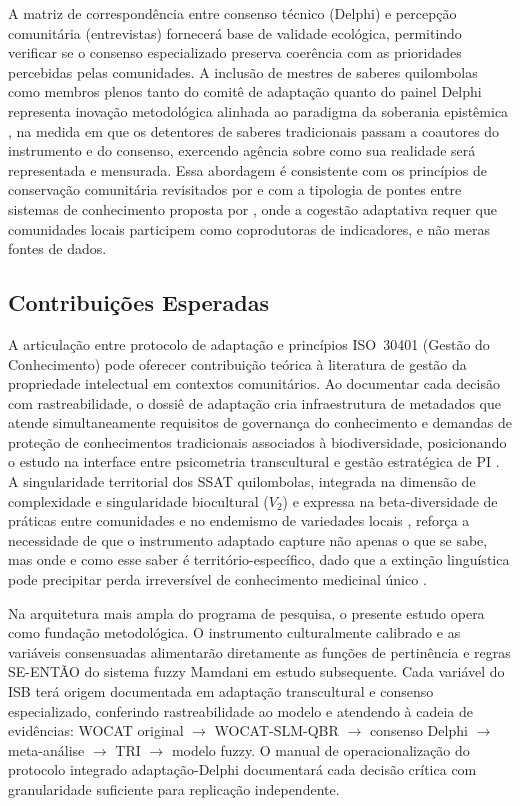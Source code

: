 \documentclass[3p,times]{elsarticle}
\begin{document}
A matriz de correspondência entre consenso técnico (Delphi) e percepção comunitária (entrevistas) fornecerá base de validade ecológica, permitindo verificar se o consenso especializado preserva coerência com as prioridades percebidas pelas comunidades. A inclusão de mestres de saberes quilombolas como membros plenos tanto do comitê de adaptação quanto do painel Delphi representa inovação metodológica alinhada ao paradigma da soberania epistêmica \citep{Santos2007}, na medida em que os detentores de saberes tradicionais passam a coautores do instrumento e do consenso, exercendo agência sobre como sua realidade será representada e mensurada. Essa abordagem é consistente com os princípios de conservação comunitária revisitados por \citet{Berkes2004,Berkes2007} e com a tipologia de pontes entre sistemas de conhecimento proposta por \citet{Rathwell2015}, onde a cogestão adaptativa \citep{OlssonFolkeBerkes2004} requer que comunidades locais participem como coprodutoras de indicadores, e não meras fontes de dados.

\subsection{Contribuições Esperadas}

A articulação entre protocolo de adaptação e princípios ISO~30401 (Gestão do Conhecimento) pode oferecer contribuição teórica à literatura de gestão da propriedade intelectual em contextos comunitários. Ao documentar cada decisão com rastreabilidade, o dossiê de adaptação cria infraestrutura de metadados que atende simultaneamente requisitos de governança do conhecimento \citep{ISO30401} e demandas de proteção de conhecimentos tradicionais associados à biodiversidade, posicionando o estudo na interface entre psicometria transcultural e gestão estratégica de PI \citep{Teece1986,ISO56005}. A singularidade territorial dos SSAT quilombolas, integrada na dimensão de complexidade e singularidade biocultural ($V_2$) e expressa na beta-diversidade de práticas entre comunidades e no endemismo de variedades locais \citep{Zimmerer2018,Rayne2022}, reforça a necessidade de que o instrumento adaptado capture não apenas o que se sabe, mas onde e como esse saber é território-específico, dado que a extinção linguística pode precipitar perda irreversível de conhecimento medicinal único \citep{CamaraLeret2021}.

Na arquitetura mais ampla do programa de pesquisa, o presente estudo opera como fundação metodológica. O instrumento culturalmente calibrado e as variáveis consensuadas alimentarão diretamente as funções de pertinência e regras SE-ENTÃO do sistema fuzzy Mamdani em estudo subsequente. Cada variável do ISB terá origem documentada em adaptação transcultural e consenso especializado, conferindo rastreabilidade ao modelo \citep{Costanza1997} e atendendo à cadeia de evidências: WOCAT original $\rightarrow$ WOCAT-SLM-QBR $\rightarrow$ consenso Delphi $\rightarrow$ meta-análise $\rightarrow$ TRI $\rightarrow$ modelo fuzzy. O manual de operacionalização do protocolo integrado adaptação-Delphi documentará cada decisão crítica com granularidade suficiente para replicação independente.
\end{document}
